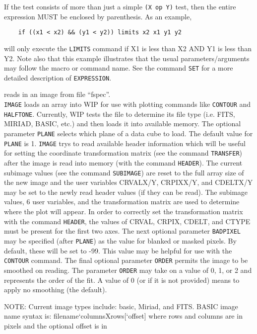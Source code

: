 	If the test consists of more than just a simple {\tt (X op Y)}
	test, then the entire expression MUST be enclosed by parenthesis.
	As an example,
	\begin{verbatim}
    if ((x1 < x2) && (y1 < y2)) limits x2 x1 y1 y2
	\end{verbatim}
	will only execute the {\tt LIMITS}
	command if X1 is less than X2 AND Y1 is less than Y2.  Note also
	that this example illustrates that the usual parameters/arguments
	may follow the macro or command name.  See the command
	{\tt SET} for a more detailed description
	of {\tt EXPRESSION}.
\item [{\tt IMAGE fspec [plane [badpixel [order]]] } --] reads in an image from file ``fspec''.\\
	{\tt IMAGE} loads an array into WIP for use with plotting
	commands like {\tt CONTOUR} and
	{\tt HALFTONE}.
	Currently, WIP tests the file to determine its file type (i.e.
	FITS, MIRIAD, BASIC, etc.) and then loads it into available memory.
	The optional parameter {\tt PLANE} selects which plane of
	a data cube to load.  The default value for {\tt PLANE} is 1.
	{\tt IMAGE} trys to read available header information which
	will be useful for setting the coordinate transformation matrix
	(see the command {\tt TRANSFER})
	after the image is read into memory (with the command
	{\tt HEADER}).  The current subimage
	values (see the command {\tt SUBIMAGE})
	are reset to the full array size of the new image and the user
	variables CRVALX/Y, CRPIXX/Y, and CDELTX/Y may be set to the newly
	read header values (if they can be read).  The subimage values,
	6 user variables, and the transformation matrix are used to
	determine where the plot will appear.  In order to correctly
	set the transformation matrix with the command
	{\tt HEADER}, the values of CRVAL,
	CRPIX, CDELT, and CTYPE must be present for the first two axes.
	The next optional parameter {\tt BADPIXEL} may be
	specified (after {\tt PLANE}) as the value for blanked or
	masked pixels.
	By default, these will be set to -99.
	This value may be helpful for use
	with the {\tt CONTOUR} command.
	The final optional parameter {\tt ORDER} permits the
	image to be smoothed on reading.  The parameter {\tt ORDER}
	may take on a value of 0, 1, or 2 and represents the order of
	the fit.  A value of 0 (or if it is not provided) means to apply
	no smoothing (the default).
	\par 
	NOTE: Current image types include:
	basic, Miriad, and FITS.
	BASIC image name syntax is: filename`columnsXrows[`offset] where
	rows and columns are in pixels and the optional offset is in
